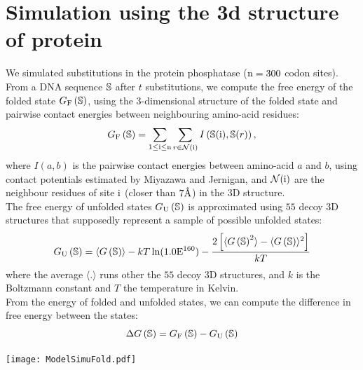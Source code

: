 \section{Simulation using the 3d structure of protein}
We simulated substitutions in the protein phosphatase ($\text{n}=300$ codon sites).
From a \acrshort{DNA} sequence $\mathbb{S}$ after $t$ substitutions, we compute the free energy of the folded state $G_{\mathrm{F}}\left(\mathbb{S}\right)$, using the $3$-dimensional structure of the folded state and pairwise contact energies between neighbouring amino-acid residues:
\begin{equation}
G_{\mathrm{F}}\left(\mathbb{S}\right) = \sum\limits_{1 \leq \text{i} \leq \text{n}} \sum\limits_{r \in \mathcal{N}(\text{i})} I \left(\mathbb{S}(\text{i}), \mathbb{S}(r) \right),
\end{equation}
where $I(a,b)$ is the pairwise contact energies between amino-acid $a$ and $b$, using contact potentials estimated by Miyazawa and Jernigan, and $\mathcal{N}(\text{i})$ are the neighbour residues of site $\text{i}$ (closer than $7\text{\normalfont\AA}$) in the $3$D structure.\\
The free energy of unfolded states $G_{\mathrm{U}}\left(\mathbb{S}\right)$ is approximated using $55$ decoy $3$D structures that supposedly represent a sample of possible unfolded states:
\begin{equation}
G_{\mathrm{U}}\left(\mathbb{S}\right) = \langle G\left(\mathbb{S}\right) \rangle - kT \ln (1.0\mathrm{E}^{160}) - \frac{2 \left[ \langle G\left(\mathbb{S}\right)^2 \rangle - \langle G\left(\mathbb{S}\right) \rangle^2\right] }{kT}
\end{equation}
where the average $\langle . \rangle$ runs other the $55$ decoy $3$D structures, and $k$ is the Boltzmann constant and $T$ the temperature in Kelvin.\\
From the energy of folded and unfolded states, we can compute the difference in free energy between the states:
\begin{equation}
\Delta G\left(\mathbb{S}\right) = G_{\mathrm{F}}\left(\mathbb{S}\right) - G_{\mathrm{U}}\left(\mathbb{S}\right)
\end{equation}
\begin{center}
 \texttt{[image: ModelSimuFold.pdf]}
\end{center}

